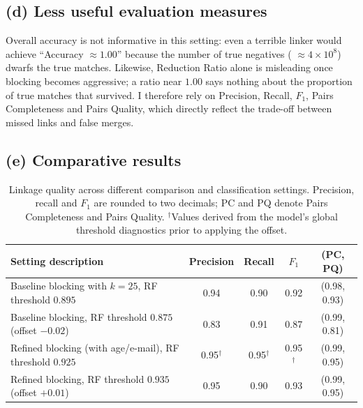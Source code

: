 \documentclass[11pt]{article}
\begin{document}
\subsection*{(d) Less useful evaluation measures}
Overall accuracy is not informative in this setting: even a terrible linker would achieve ``Accuracy $\approx 1.00$'' because the number of true negatives ( $\approx 4 \times 10^{8}$) dwarfs the true matches. Likewise, Reduction Ratio alone is misleading once blocking becomes aggressive; a ratio near $1.00$ says nothing about the proportion of true matches that survived. I therefore rely on Precision, Recall, $F_{1}$, Pairs Completeness and Pairs Quality, which directly reflect the trade-off between missed links and false merges.

\subsection*{(e) Comparative results}
\begin{table}[h]
\centering
\begin{tabular}{p{}cccc}
\toprule
Setting description & Precision & Recall & $F_{1}$ & (PC, PQ) \\
\midrule
Baseline blocking with $k{=}25$, RF threshold $0.895$ & 0.94 & 0.90 & 0.92 & (0.98, 0.93) \\
Baseline blocking, RF threshold $0.875$ (offset $-0.02$) & 0.83 & 0.91 & 0.87 & (0.99, 0.81) \\
Refined blocking (with age/e-mail), RF threshold $0.925$ & 0.95$^{\dagger}$ & 0.95$^{\dagger}$ & 0.95$^{\dagger}$ & (0.99, 0.95) \\
Refined blocking, RF threshold $0.935$ (offset $+0.01$) & 0.95 & 0.90 & 0.93 & (0.99, 0.95) \\
\bottomrule
\end{tabular}
\caption{Linkage quality across different comparison and classification settings. Precision, recall and $F_{1}$ are rounded to two decimals; PC and PQ denote Pairs Completeness and Pairs Quality. $^{\dagger}$Values derived from the model's global threshold diagnostics prior to applying the offset.}
\end{table}
\end{document}
